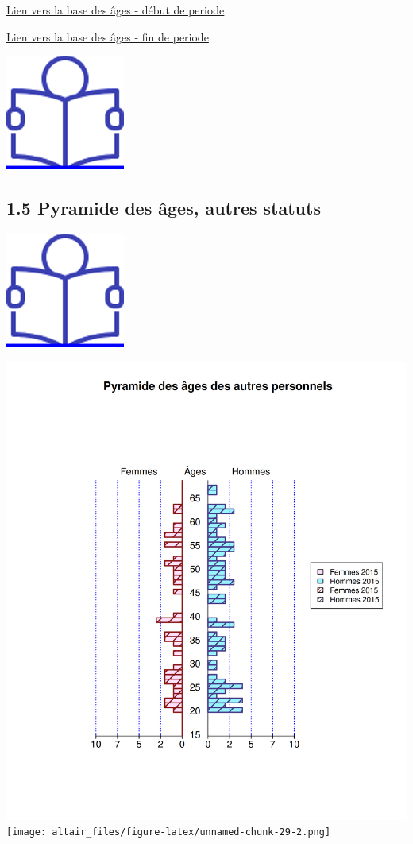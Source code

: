 \href{../Bases/Effectifs/Pyramide-des-ages-des-non-titulaires_2011.csv}{Lien
vers la base des âges - début de periode}

\href{../Bases/Effectifs/Pyramide-des-ages-des-non-titulaires_2014.csv}{Lien
vers la base des âges - fin de periode}

\href{../Docs/Notices/fiche_1.odt}{\includegraphics{icones/Notice.png}}

\hypertarget{pyramide-des-ages-autres-statuts}{%
\subsection{1.5 Pyramide des âges, autres statuts
~}\label{pyramide-des-ages-autres-statuts}}

\href{../Docs/Notices/fiche_2.odt}{\includegraphics{icones/Notice.png}}

\includegraphics{altair_files/figure-latex/unnamed-chunk-29-1.png}
\newpage
\texttt{[image: altair\_files/figure-latex/unnamed-chunk-29-2.png]}


